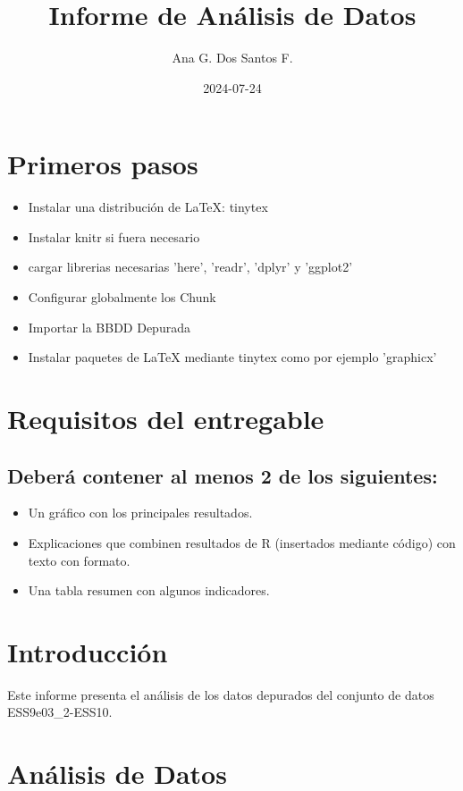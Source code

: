 \documentclass{article}\usepackage[]{graphicx}\usepackage[]{xcolor}
\title{Informe de Análisis de Datos}
\author{Ana G. Dos Santos F.}
\date{2024-07-24}
\begin{document}
\maketitle

\section*{Primeros pasos}

\begin{itemize}
\item Instalar una distribución de \LaTeX{}: tinytex
\item Instalar knitr si fuera necesario
\item cargar librerias necesarias 'here', 'readr', 'dplyr' y 'ggplot2'
\item Configurar globalmente los Chunk
\item Importar la BBDD Depurada
\item Instalar paquetes de \LaTeX{} mediante tinytex como por ejemplo 'graphicx'
\end{itemize}





\section{Requisitos del entregable}
\subsection{Deberá contener al menos 2 de los siguientes:}

\begin{itemize}
\item Un gráfico con los principales resultados.
\item Explicaciones que combinen resultados de R (insertados mediante código) con texto con formato.
\item Una tabla resumen con algunos indicadores.
\end{itemize}

\section{Introducción}
Este informe presenta el análisis de los datos depurados del conjunto de datos ESS9e03\_2-ESS10.

\section{Análisis de Datos}
\end{document}

